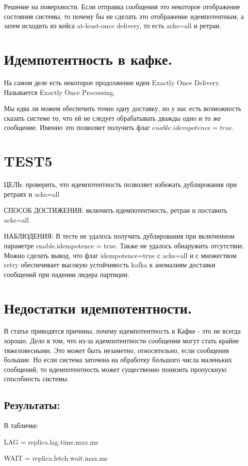 \documentclass[11pt]{article}
\begin{document}
    Решение на поверхности. Если отправка сообщения это некоторое отображение состояния системы, то почему бы не сделать это отображение идемпотентным, а затем исходить из кейса at-least-once delivery, то есть acks=all и ретраи.

    \section{Идемпотентность в кафке.}
    На самом деле есть некоторое продолжение идеи Exactly Once Delivery. Называется Exactly Once Processing.

    Мы едва ли можем обеспечить точно одну доставку, но у нас есть возможность сказать системе то, что ей не следует обрабатывать дважды одно и то же сообщение. Именно это позволяет получить флаг $enable.idempotence = true$.
    
    \section{TEST5}
    ЦЕЛЬ: проверить, что идемпотентность позволяет избежать дублирования при ретраях и acks=all

    СПОСОБ ДОСТИЖЕНИЯ: включить идемпотентность, ретраи и поставить acks=all

    НАБЛЮДЕНИЯ: В тесте не удалось получить дублирования при включенном параметре enable.idempotence = true. Также не
    удалось обнаружить отсутствие. Можно сделать вывод, что флаг idempotence=true с acks=all и с множеством retry
    обеспечивает высокую устойчивость kafka к аномалиям доставки сообщений при падении лидера партиции.
    \section{Недостатки идемпотентности.}
    В статье приводятся причины, почему идемпотентность в Кафке - это не всегда хорошо. Дело в том, что
    из-за идемпотентности сообщения могут стать крайне тяжеловесными. Это может быть незаметно, относительно, если
    сообщения большие. Но если система заточена на обработку большого числа маленьких сообщений, то идемпотентность
    может существенно понизить пропускную способность системы.
    \subsection{Результаты:}
    В табличке:

        LAG = replica.lag.time.max.ms

        WAIT = replica.fetch.wait.max.ms
\end{document}
